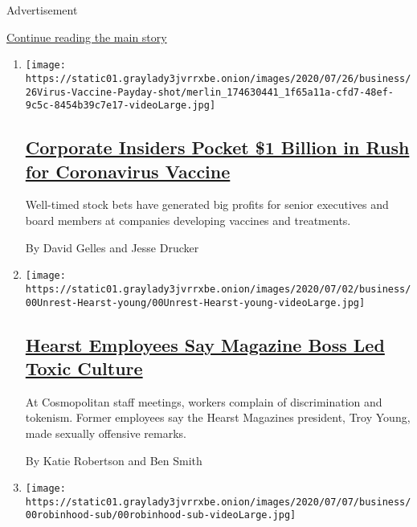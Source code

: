 Advertisement

\protect\hyperlink{after-subheader}{Continue reading the main story}

\begin{enumerate}
\def\labelenumi{\arabic{enumi}.}
\item
  \texttt{[image: https://static01.graylady3jvrrxbe.onion/images/2020/07/26/business/26Virus-Vaccine-Payday-shot/merlin\_174630441\_1f65a11a-cfd7-48ef-9c5c-8454b39c7e17-videoLarge.jpg]}

  \hypertarget{corporate-insiders-pocket-1-billion-in-rush-for-coronavirus-vaccine}{%
  \subsection{\texorpdfstring{\href{/2020/07/25/business/coronavirus-vaccine-profits-vaxart.html}{Corporate
  Insiders Pocket \$1 Billion in Rush for Coronavirus
  Vaccine}}{Corporate Insiders Pocket \$1 Billion in Rush for Coronavirus Vaccine}}\label{corporate-insiders-pocket-1-billion-in-rush-for-coronavirus-vaccine}}

  Well-timed stock bets have generated big profits for senior executives
  and board members at companies developing vaccines and treatments.

  By David Gelles and Jesse Drucker
\item
  \texttt{[image: https://static01.graylady3jvrrxbe.onion/images/2020/07/02/business/00Unrest-Hearst-young/00Unrest-Hearst-young-videoLarge.jpg]}

  \hypertarget{hearst-employees-say-magazine-boss-led-toxic-culture}{%
  \subsection{\texorpdfstring{\href{/2020/07/22/business/media/hearst-harassment-troy-young.html}{Hearst
  Employees Say Magazine Boss Led Toxic
  Culture}}{Hearst Employees Say Magazine Boss Led Toxic Culture}}\label{hearst-employees-say-magazine-boss-led-toxic-culture}}

  At Cosmopolitan staff meetings, workers complain of discrimination and
  tokenism. Former employees say the Hearst Magazines president, Troy
  Young, made sexually offensive remarks.

  By Katie Robertson and Ben Smith
\item
  \texttt{[image: https://static01.graylady3jvrrxbe.onion/images/2020/07/07/business/00robinhood-sub/00robinhood-sub-videoLarge.jpg]}


\end{enumerate}
